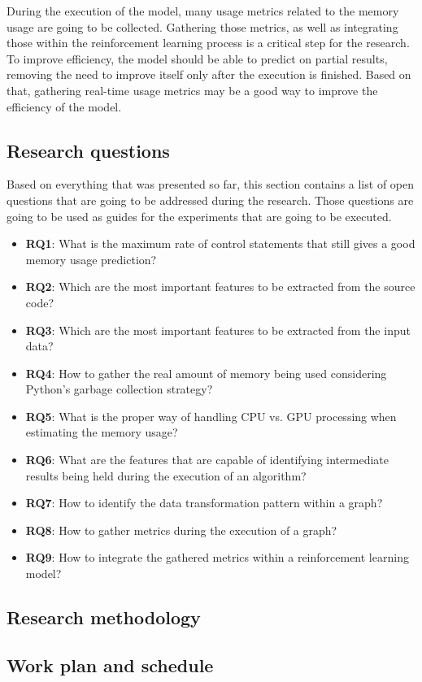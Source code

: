 During the execution of the model, many usage metrics related to the memory usage are going to be collected.
Gathering those metrics, as well as integrating those within the reinforcement learning process is a critical step for the research.
To improve efficiency, the model should be able to predict on partial results, removing the need to improve itself only after the execution is finished.
Based on that, gathering real-time usage metrics may be a good way to improve the efficiency of the model.

\subsection{Research questions}
\label{subsec:research-questions}

Based on everything that was presented so far, this section contains a list of open questions that are going to be addressed during the research.
Those questions are going to be used as guides for the experiments that are going to be executed.

\begin{itemize}
  \item \textbf{RQ1}: What is the maximum rate of control statements that still gives a good memory usage prediction?
  \item \textbf{RQ2}: Which are the most important features to be extracted from the source code?
  \item \textbf{RQ3}: Which are the most important features to be extracted from the input data?
  \item \textbf{RQ4}: How to gather the real amount of memory being used considering Python's garbage collection strategy?
  \item \textbf{RQ5}: What is the proper way of handling CPU vs. GPU processing when estimating the memory usage?
  \item \textbf{RQ6}: What are the features that are capable of identifying intermediate results being held during the execution of an algorithm?
  \item \textbf{RQ7}: How to identify the data transformation pattern within a graph?
  \item \textbf{RQ8}: How to gather metrics during the execution of a graph?
  \item \textbf{RQ9}: How to integrate the gathered metrics within a reinforcement learning model?
\end{itemize}

\subsection{Research methodology}
\label{subsec:research-methodology}

\subsection{Work plan and schedule}
\label{subsec:work-plan-and-schedule}
